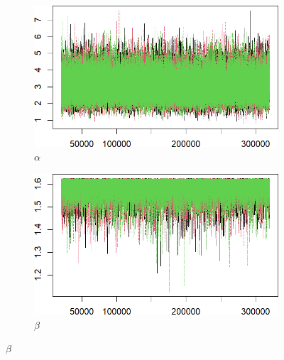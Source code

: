 \documentclass{Class/julia}
\begin{document}
\begin{figure}[!ht]
    \centering
    \caption{Trace Plots After Thinning}
    \label{fig:7}
    \begin{subfigure}{0.45\textwidth}
        \centering
        \includegraphics[width=\textwidth]{rytgaard1990/trace_after_thinning_alpha.png}
        \caption{\( \alpha \)}
    \end{subfigure}
    \hfill
    \begin{subfigure}{0.45\textwidth}
        \centering
        \includegraphics[width=\textwidth]{rytgaard1990/trace_after_thinning_beta.png}
        \caption{\( \beta \)}
    \end{subfigure}

    \vspace{1em}


\end{figure}
\end{document}
